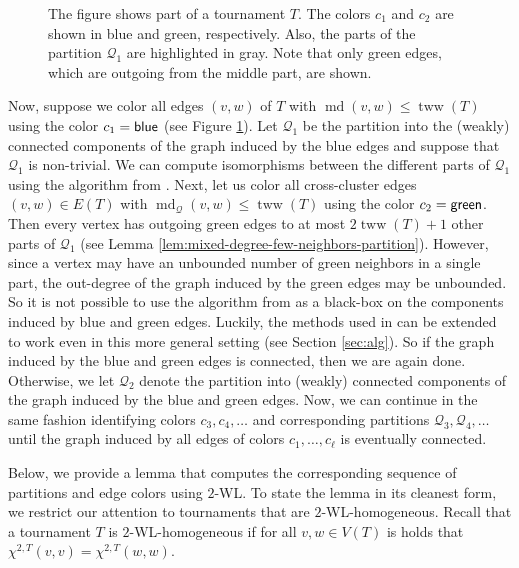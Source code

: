 \PassOptionsToPackage{dvipsnames,svgnames}{xcolor}\documentclass[10pt,a4paper]{article}
\newcommand{\CQ}{{\mathcal Q}}
\newcommand{\WL}[2]{\chi^{#1,#2}}
\DeclareMathOperator{\md}{md}
\DeclareMathOperator{\tww}{tww}
\newcommand{\blue}{{\sf blue}}
\newcommand{\green}{{\sf green}}
\begin{document}
\begin{figure}
 \caption{The figure shows part of a tournament $T$. The colors $c_1$ and $c_2$ are shown in blue and green, respectively.
  Also, the parts of the partition $\CQ_1$ are highlighted in gray.
  Note that only green edges, which are outgoing from the middle part, are shown.}
 \label{fig:partition-sequence}
\end{figure}

Now, suppose we color all edges $(v,w)$ of $T$ with $\md(v,w) \leq \tww(T)$ using the color $c_1 = \blue$ (see Figure \ref{fig:partition-sequence}).
Let $\CQ_1$ be the partition into the (weakly) connected components of the graph induced by the blue edges and suppose that $\CQ_1$ is non-trivial.
We can compute isomorphisms between the different parts of $\CQ_1$ using the algorithm from \cite{ArvindPR25}.
Next, let us color all cross-cluster edges $(v,w)\in E(T)$ with $\md_\CQ(v,w) \leq \tww(T)$ using the color $c_2 = \green$.
Then every vertex has outgoing green edges to at most $2\tww(T) + 1$ other parts of $\CQ_1$ (see Lemma \ref{lem:mixed-degree-few-neighbors-partition}).
However, since a vertex may have an unbounded number of green neighbors in a single part, the out-degree of the graph induced by the green edges may be unbounded.
So it is not possible to use the algorithm from \cite{ArvindPR25} as a black-box on the components induced by blue and green edges.
Luckily, the methods used in \cite{ArvindPR25} can be extended to work even in this more general setting (see Section \ref{sec:alg}).
So if the graph induced by the blue and green edges is connected, then we are again done.
Otherwise, we let $\CQ_2$ denote the partition into (weakly) connected components of the graph induced by the blue and green edges.
Now, we can continue in the same fashion identifying colors $c_3,c_4,\dots$ and corresponding partitions $\CQ_3,\CQ_4,\dots$ until the graph induced by all edges of colors $c_1,\dots,c_\ell$ is eventually connected.

Below, we provide a lemma that computes the corresponding sequence of partitions and edge colors using $2$-WL.
To state the lemma in its cleanest form, we restrict our attention to tournaments that are $2$-WL-homogeneous.
Recall that a tournament $T$ is $2$-WL-homogeneous if for all $v,w\in V(T)$ is holds that $\WL{2}{T}(v,v) = \WL{2}{T}(w,w)$.
\end{document}
